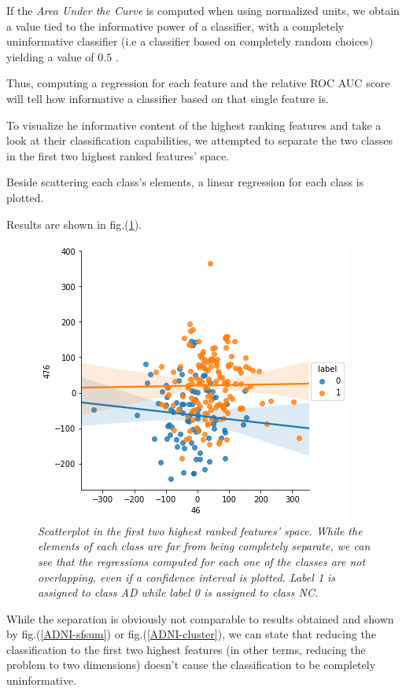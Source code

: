 \documentclass[12pt,openright,twoside,a4paper]{book}
\begin{document}
If the \textit{Area Under the Curve} is computed when using normalized units, we obtain a value tied to the informative power of a classifier, with a completely uninformative classifier (i.e a classifier based on completely random choices) yielding a value of $0.5$ \cite{ROC}.
\vspace{5mm}

Thus, computing a regression for each feature and the relative ROC AUC score will tell how informative a classifier based on that single feature is. 

To visualize he informative content of the highest ranking features and take a look at their classification capabilities, we attempted to separate the two classes in the first two highest ranked features' space.

Beside scattering each class's elements, a linear regression for each class is plotted.

Results are shown in fig.(\ref{ADNI-fsep}).

\begin{figure}[!h]
\centering
\includegraphics[scale=0.7]{first-feat-sep}
\caption{\textit{Scatterplot in the first two highest ranked features' space. While  the elements of each class are far from being completely separate, we can see that the regressions computed for each one of the classes are not overlapping, even if a confidence interval is plotted. Label 1 is assigned to class AD while label 0 is assigned to class NC. }}
\label{ADNI-fsep}
\end{figure}

While the separation is obviously not comparable to results obtained and shown by fig.(\ref{ADNI-sfsum}) or fig.(\ref{ADNI-cluster}), we can state that reducing the classification to the first two highest features (in other terms, reducing the problem to two dimensions) doesn't cause the classification to be completely uninformative.
\end{document}
